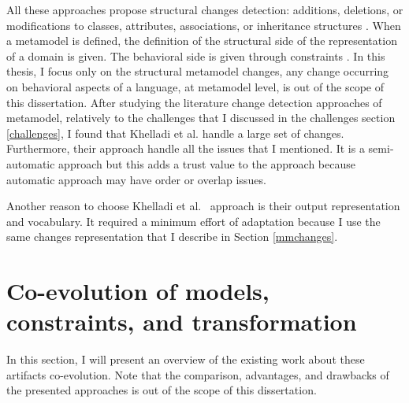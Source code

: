 All these approaches propose structural changes detection: additions, deletions, or modifications to classes, attributes, associations, or inheritance structures \cite{10.1007/s10270-013-0392-y}. When a metamodel is defined, the definition of the structural side of the representation of a domain is given. The behavioral side is given through constraints \cite{10.1007/s10515-009-0053-0}. In this thesis, I focus only on the structural metamodel changes, any change occurring on behavioral aspects of a language, at metamodel level, is out of the scope of this dissertation.
After studying the literature change detection approaches of metamodel, relatively to the challenges that I discussed in the challenges section \ref{challenges}, I found that Khelladi et al. \cite{khelladi2016detecting} handle a large set of changes. Furthermore, their approach handle all the issues that I mentioned. 
It is a semi-automatic approach but this adds a trust value to the approach because automatic approach may have order or overlap issues.

Another reason to choose Khelladi et al.~\cite{khelladi2016detecting} approach is their output representation and vocabulary. It required a minimum effort of adaptation because I use the same changes representation that I describe in Section \ref{mmchanges}.


 \section{Co-evolution of models, constraints, and transformation}
 \label{coevolutionartifacts}
 In this section, I will present an overview of the existing work about these artifacts co-evolution. Note that the comparison, advantages, and drawbacks of the presented approaches is out of the scope of this dissertation.
 
